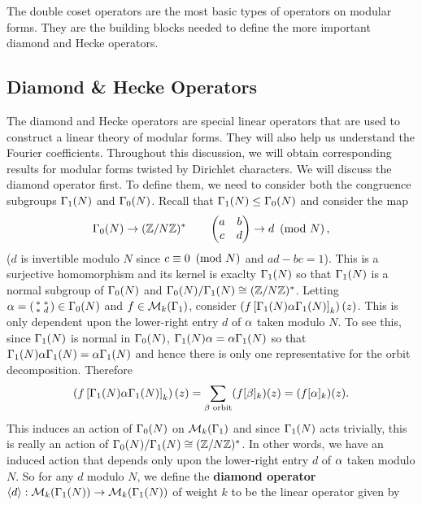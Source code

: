       The double coset operators are the most basic types of operators on modular forms. They are the building blocks needed to define the more important diamond and Hecke operators.
    \subsection*{Diamond \& Hecke Operators}
      The diamond and Hecke operators are special linear operators that are used to construct a linear theory of modular forms. They will also help us understand the Fourier coefficients. Throughout this discussion, we will obtain corresponding results for modular forms twisted by Dirichlet characters. We will discuss the diamond operator first. To define them, we need to consider both the congruence subgroups $\Gamma_{1}(N)$ and $\Gamma_{0}(N)$. Recall that $\Gamma_{1}(N) \le \Gamma_{0}(N)$ and consider the map
      \[
        \Gamma_{0}(N) \to (\mathbb{Z}/N\mathbb{Z})^{\ast} \qquad \begin{pmatrix} a & b \\ c & d\end{pmatrix} \to d \ \left(\text{mod }N\right),
      \]
      ($d$ is invertible modulo $N$ since $c \equiv 0 \ \left(\text{mod }N\right)$ and $ad-bc = 1$). This is a surjective homomorphism and its kernel is exaclty $\Gamma_{1}(N)$ so that $\Gamma_{1}(N)$ is a normal subgroup of $\Gamma_{0}(N)$ and $\Gamma_{0}(N)/\Gamma_{1}(N) \cong (\mathbb{Z}/N\mathbb{Z})^{\ast}$. Letting $\alpha = \begin{psmallmatrix} \ast & \ast \\ \ast & d \end{psmallmatrix} \in \Gamma_{0}(N)$ and $f \in \mathcal{M}_{k}(\Gamma_{1})$, consider $\left(f\left[\Gamma_{1}(N)\alpha\Gamma_{1}(N)\right]_{k}\right)(z)$. This is only dependent upon the lower-right entry $d$ of $\alpha$ taken modulo $N$. To see this, since $\Gamma_{1}(N)$ is normal in $\Gamma_{0}(N)$, $\Gamma_{1}(N)\alpha = \alpha\Gamma_{1}(N)$ so that $\Gamma_{1}(N)\alpha\Gamma_{1}(N) = \alpha\Gamma_{1}(N)$ and hence there is only one representative for the orbit decomposition. Therefore
      \[
        \left(f\left[\Gamma_{1}(N)\alpha\Gamma_{1}(N)\right]_{k}\right)(z) = \sum_{\beta \text{ orbit}}(f[\beta]_{k})(z) = (f[\alpha]_{k})(z).
      \]
      This induces an action of $\Gamma_{0}(N)$ on $\mathcal{M}_{k}(\Gamma_{1})$ and since $\Gamma_{1}(N)$ acts trivially, this is really an action of $\Gamma_{0}(N)/\Gamma_{1}(N) \cong (\mathbb{Z}/N\mathbb{Z})^{\ast}$. In other words, we have an induced action that depends only upon the lower-right entry $d$ of $\alpha$ taken modulo $N$. So for any $d$ modulo $N$, we define the \textbf{diamond operator} $\langle d\rangle:\mathcal{M}_{k}(\Gamma_{1}(N)) \to \mathcal{M}_{k}(\Gamma_{1}(N))$ of weight $k$ to be the linear operator given by

